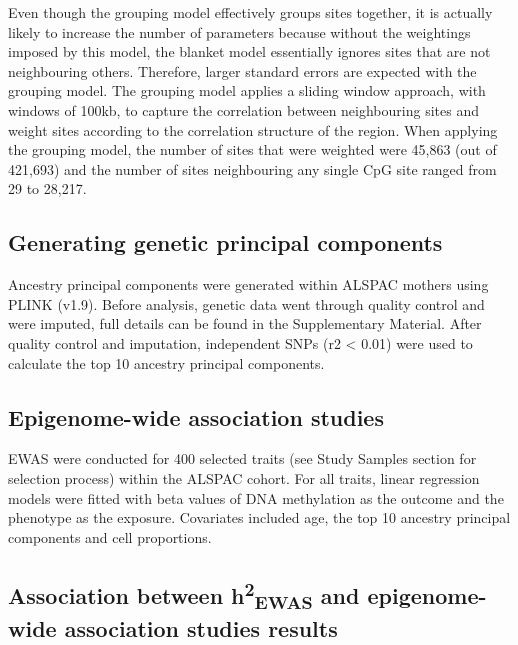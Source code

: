\documentclass[11pt,oneside]{bristolthesis}
\begin{document}
Even though the grouping model effectively groups sites together, it is actually likely to increase the number of parameters because without the weightings imposed by this model, the blanket model essentially ignores sites that are not neighbouring others. Therefore, larger standard errors are expected with the grouping model. The grouping model applies a sliding window approach, with windows of 100kb, to capture the correlation between neighbouring sites and weight sites according to the correlation structure of the region. When applying the grouping model, the number of sites that were weighted were 45,863 (out of 421,693) and the number of sites neighbouring any single CpG site ranged from 29 to 28,217.

\hypertarget{generating-genetic-principal-components}{%
\subsection{Generating genetic principal components}\label{generating-genetic-principal-components}}

Ancestry principal components were generated within ALSPAC mothers using PLINK (v1.9). Before analysis, genetic data went through quality control and were imputed, full details can be found in the Supplementary Material. After quality control and imputation, independent SNPs (r2 \textless{} 0.01) were used to calculate the top 10 ancestry principal components.

\hypertarget{methods-ewas-05}{%
\subsection{Epigenome-wide association studies}\label{methods-ewas-05}}

EWAS were conducted for 400 selected traits (see Study Samples section for selection process) within the ALSPAC cohort. For all traits, linear regression models were fitted with beta values of DNA methylation as the outcome and the phenotype as the exposure. Covariates included age, the top 10 ancestry principal components and cell proportions.

\hypertarget{methods-h2ewas-dmp}{%
\subsection{\texorpdfstring{Association between h\textsuperscript{2}\textsubscript{EWAS} and epigenome-wide association studies results}{Association between h2EWAS and epigenome-wide association studies results}}\label{methods-h2ewas-dmp}}
\end{document}
